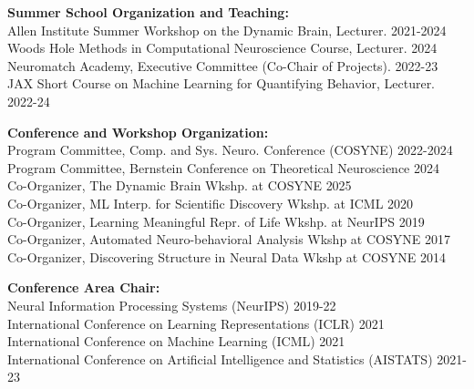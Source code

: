 \documentclass[10pt]{article}
\begin{document}
\begin{outerlist}

\item \textbf{Summer School Organization and Teaching:} \\
  Allen Institute Summer Workshop on the Dynamic Brain, Lecturer. \hfill{\small 2021-2024}\\
  Woods Hole Methods in Computational Neuroscience Course, Lecturer. \hfill{\small 2024}\\
  Neuromatch Academy, Executive Committee (Co-Chair of Projects). \hfill{\small 2022-23} \\
  JAX Short Course on Machine Learning for Quantifying Behavior, Lecturer. \hfill {\small 2022-24}\\
  
\item \textbf{Conference and Workshop Organization:} \\
  Program Committee, Comp. and Sys. Neuro. Conference (COSYNE) \hfill{\small 2022-2024} \\
  Program Committee, Bernstein Conference on Theoretical Neuroscience \hfill{\small 2024} \\
  Co-Organizer, The Dynamic Brain Wkshp. at COSYNE \hfill{\small 2025} \\
  Co-Organizer, ML Interp. for Scientific Discovery Wkshp. at ICML \hfill{\small 2020}\\
  Co-Organizer, Learning Meaningful Repr. of Life Wkshp. at NeurIPS \hfill{\small 2019}\\
  Co-Organizer, Automated Neuro-behavioral Analysis Wkshp at COSYNE \hfill{\small 2017}\\
  Co-Organizer, Discovering Structure in Neural Data Wkshp at COSYNE \hfill{\small 2014}

\item \textbf{Conference Area Chair:} \\
  Neural Information Processing Systems (NeurIPS) \hfill{\small 2019-22}\\
  International Conference on Learning Representations (ICLR) \hfill{\small 2021}\\
  International Conference on Machine Learning (ICML) \hfill{\small 2021}\\
  International Conference on Artificial Intelligence and Statistics (AISTATS) \hfill{\small 2021-23}
  

\end{outerlist}
\end{document}
